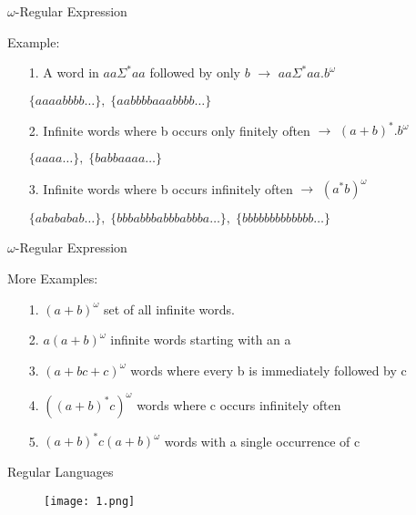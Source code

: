 \documentclass[17pt, t, lualatex]{beamer}
\begin{document}
\begin{frame}{$\omega$-Regular Expression}
\begin{block}{Example:}
\begin{itemize}
    \item[1.]
    A word in $aa\Sigma^*aa$ followed by only $b$ $\rightarrow$ 
    $aa\Sigma^*aa.b^{\omega}$
    \begin{center}
        $\{aaaabbbb\ldots\},\; \{aabbbbaaabbbb\ldots\}$
    \end{center}
    \item[2.]
    Infinite words where b occurs only finitely often $\rightarrow$ $(a+b)^*.b^{\omega}$
    \begin{center}
        $\{aaaa\ldots\},\; \{babbaaaa\ldots\}$
    \end{center}
    \item[3.]
    Infinite words where b occurs infinitely often $\rightarrow$
    $(a^*b)^{\omega}$
    \begin{center}
        $\{abababab\ldots\},\;\{bbbabbbabbbabbba\ldots\},\;
        \{bbbbbbbbbbbbb\ldots\}$
    \end{center}
\end{itemize}
\end{block}
\end{frame}

\begin{frame}{$\omega$-Regular Expression}
\begin{block}{More Examples:}
\begin{itemize}
    \item[1.]
     $(a + b)^{\omega}$ set of all infinite words.
     \item[2.]
     $a(a + b)^{\omega}$ infinite words starting with an a
     \item[3.]
      $(a + bc + c)^{\omega}$ words where every b is immediately followed by c
      \item[4.]
      $((a + b)^*c)^{\omega}$ words where c occurs infinitely often
      \item[5.]
      $(a + b)^*c(a + b)^{\omega}$ words with a single occurrence of c
\end{itemize}
\end{block}
\end{frame}

\begin{frame}{Regular Languages}
    \begin{figure}
        \centering
        \texttt{[image: 1.png]}
    \end{figure}
\end{frame}
\end{document}
